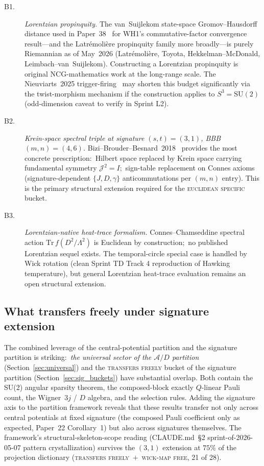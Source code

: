 \documentclass[twocolumn,pra,amsmath,amssymb,superscriptaddress]{revtex4-2}
\begin{document}
\begin{description}
\item[B1\@.] \emph{Lorentzian propinquity.}  The van~Suijlekom
  state-space Gromov--Hausdorff distance used in Paper~38~\cite{paper38}
  for WH1's commutative-factor convergence result---and the Latr\'emoli\`ere propinquity
  family more broadly---is purely Riemannian as of May~2026
  (Latr\'emoli\`ere, Toyota, Hekkelman--McDonald,
  Leimbach--van~Suijlekom).  Constructing
  a Lorentzian propinquity is original NCG-mathematics work at the
  long-range scale.  The Nieuviarts~2025
  trigger-firing~\cite{nieuviarts2025a, nieuviarts2025b} may shorten
  this budget significantly via the twist-morphism mechanism if the
  construction applies to $S^3 = \mathrm{SU}(2)$ (odd-dimension caveat
  to verify in Sprint L2).
\item[B2\@.] \emph{Krein-space spectral triple at signature $(s, t) = (3, 1)$, BBB $(m, n) = (4, 6)$.}
  Bizi--Brouder--Besnard~2018~\cite{bizi_brouder_besnard2018} provides
  the most concrete prescription:\ Hilbert space replaced by Krein
  space carrying fundamental symmetry $\mathcal{J}^2 = I$;\
  sign-table replacement on Connes axioms (signature-dependent
  $\{J, D, \gamma\}$ anticommutations per $(m, n)$ entry).  This is the
  primary structural extension required for the
  \textsc{euclidean specific} bucket.
\item[B3\@.] \emph{Lorentzian-native heat-trace formalism.}
  Connes--Chamseddine spectral action
  $\mathrm{Tr}\,f(D^2/\Lambda^2)$ is Euclidean by construction;\
  no published Lorentzian sequel exists.  The temporal-circle special
  case is handled by Wick rotation (clean Sprint TD Track 4 reproduction
  of Hawking temperature), but general Lorentzian heat-trace evaluation
  remains an open structural extension.
\end{description}

\subsection{What transfers freely under signature extension}
\label{sec:sig_transfers}

The combined leverage of the central-potential partition and the
signature partition is striking:\ \emph{the universal sector of the
$\mathcal{A}/D$ partition} (Section~\ref{sec:universal}) and the
\textsc{transfers freely} bucket of the signature partition
(Section~\ref{sec:sig_buckets}) have substantial overlap.  Both
contain the SU(2) angular sparsity theorem, the composed-block
exactly $Q$-linear Pauli count, the Wigner~$3j$ / $D$ algebra, and
the selection rules.  Adding the signature axis to the partition
framework reveals that these results transfer not only across central
potentials at fixed signature (the composed Pauli coefficient only as
expected, Paper~22 Corollary~1) but also across signatures themselves.
The framework's structural-skeleton-scope reading (CLAUDE.md~\S2
sprint-of-2026-05-07 pattern crystallization) survives the $(3, 1)$
extension at $75\%$ of the projection dictionary
(\textsc{transfers freely}~$+$~\textsc{wick-map free}, 21 of 28).
\end{document}
